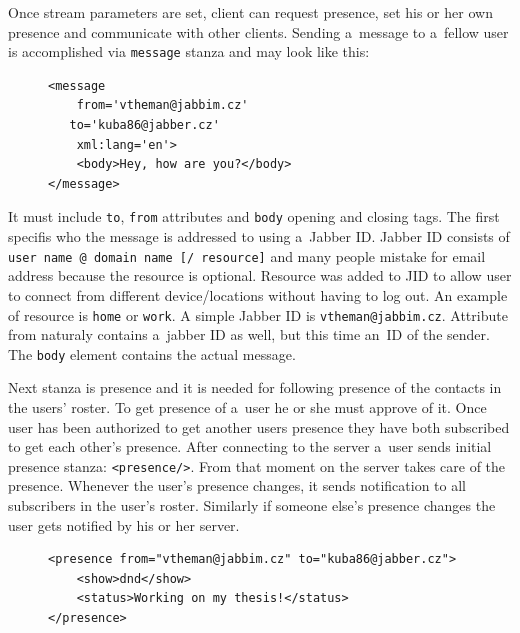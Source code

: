 Once stream parameters are set, client can request presence, set his or her own presence and communicate with other clients. Sending a~message to a~fellow user is accomplished via \verb|message| stanza and may look like this:

\begin{figure}[h]
\begin{lstlisting}
<message 
	from='vtheman@jabbim.cz'
   to='kuba86@jabber.cz'
	xml:lang='en'>
	<body>Hey, how are you?</body>
</message>
\end{lstlisting}
\end{figure}

It must include \verb|to|, \verb|from| attributes and \verb|body| opening and closing tags. The first specifis who the message is addressed to using a~Jabber ID. Jabber ID consists of \newline\verb|user name @ domain name [/ resource]| and many people mistake for email address because the resource is optional. Resource was added to JID to allow user to connect from different device/locations without having to log out. An example of resource is \verb|home| or \verb|work|. A simple Jabber ID is \verb|vtheman@jabbim.cz|. Attribute from naturaly contains a~jabber ID as well, but this time an~ID of the sender. The \verb|body| element contains the actual message. 

Next stanza is presence and it is needed for following presence of the contacts in the users' roster. To get presence of a~user he or she must approve of it. Once user has been authorized to get another users presence they have both subscribed to get each other's presence. After connecting to the server a~user sends initial presence stanza: \verb|<presence/>|. From that moment on the server takes care of the presence. Whenever the user's presence changes, it sends notification to all subscribers in the user's roster. Similarly if someone else's presence changes the user gets notified by his or her server. 

\begin{figure}[h]
\begin{lstlisting}
<presence from="vtheman@jabbim.cz" to="kuba86@jabber.cz">
	<show>dnd</show>
	<status>Working on my thesis!</status>
</presence>
\end{lstlisting}
\end{figure}

